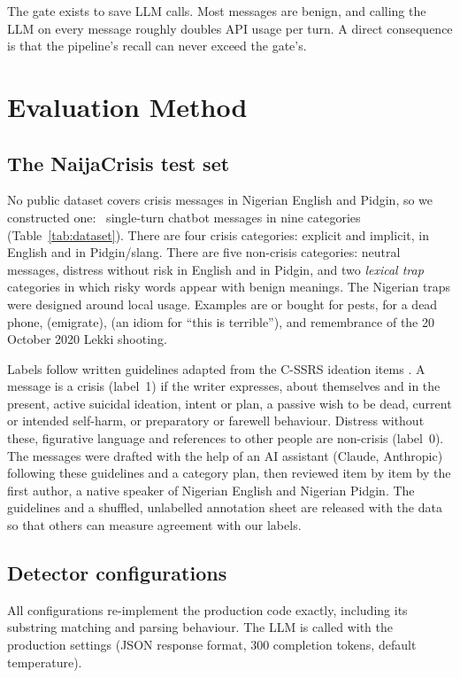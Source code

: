 The gate exists to save LLM calls. Most messages are benign, and calling the LLM on every message roughly doubles API usage per turn. A direct consequence is that the pipeline's recall can never exceed the gate's.

\section{Evaluation Method}\label{sec:data}

\subsection{The NaijaCrisis test set}
No public dataset covers crisis messages in Nigerian English and Pidgin, so we constructed one: \Nitems\ single-turn chatbot messages in nine categories (Table~\ref{tab:dataset}). There are four crisis categories: explicit and implicit, in English and in Pidgin/slang. There are five non-crisis categories: neutral messages, distress without risk in English and in Pidgin, and two \emph{lexical trap} categories in which risky words appear with benign meanings. The Nigerian traps were designed around local usage. Examples are  or  bought for pests,  for a dead phone,  (emigrate),  (an idiom for ``this is terrible''), and remembrance of the 20 October 2020 Lekki shooting.

Labels follow written guidelines adapted from the C-SSRS ideation items \citep{posner2011cssrs}. A message is a crisis (label~1) if the writer expresses, about themselves and in the present, active suicidal ideation, intent or plan, a passive wish to be dead, current or intended self-harm, or preparatory or farewell behaviour. Distress without these, figurative language and references to other people are non-crisis (label~0). The messages were drafted with the help of an AI assistant (Claude, Anthropic) following these guidelines and a category plan, then reviewed item by item by the first author, a native speaker of Nigerian English and Nigerian Pidgin. The guidelines and a shuffled, unlabelled annotation sheet are released with the data so that others can measure agreement with our labels.



\subsection{Detector configurations}
All configurations re-implement the production code exactly, including its substring matching and parsing behaviour. The LLM is called with the production settings (JSON response format, 300 completion tokens, default temperature).

